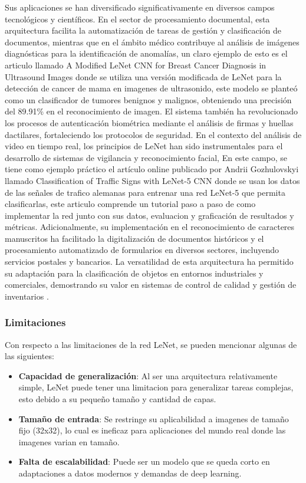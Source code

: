 Sus aplicaciones se han diversificado significativamente en diversos 
campos tecnológicos y científicos. En el sector de procesamiento documental, 
 esta arquitectura facilita la automatización de tareas de gestión y 
 clasificación de documentos, mientras que en el ámbito médico 
 contribuye al análisis de imágenes diagnósticas para la identificación 
 de anomalías, un claro ejemplo de esto es el articulo llamado 
 A Modified LeNet CNN for Breast Cancer Diagnosis in Ultrasound Images 
 \cite{lenet_medical} donde se utiliza una versión modificada de LeNet
    para la detección de cancer de mama en imagenes de ultrasonido, 
 este modelo se planteó como un clasificador de tumores benignos y
    malignos, obteniendo una precisión del 89.91\% en el reconocimiento
    de imagen. El sistema también ha revolucionado los procesos de 
 autenticación biométrica mediante el análisis de firmas y huellas 
 dactilares, fortaleciendo los protocolos de seguridad. 
 En el contexto del análisis de video en tiempo real, los principios 
 de LeNet han sido instrumentales para el desarrollo de sistemas de 
 vigilancia y reconocimiento facial, En este campo, se tiene como 
 ejemplo práctico el artículo online publicado por Andrii Gozhulovskyi
 llamado Classification of Traffic Signs with LeNet-5 CNN
 \cite{lenet_traffic_sings} donde se usan los datos de las señales de 
 trafico alemanas para entrenar una red LeNet-5 que permita 
 clasificarlas, este articulo comprende un tutorial paso a paso de 
 como implementar la red junto con sus datos, evaluacion y graficación
 de resultados y métricas. Adicionalmente, su implementación 
 en el reconocimiento de caracteres manuscritos ha facilitado la
  digitalización de documentos históricos y el procesamiento 
  automatizado de formularios en diversos sectores, incluyendo servicios
   postales y bancarios. La versatilidad de esta arquitectura ha 
   permitido su adaptación para la clasificación de objetos en entornos 
   industriales y comerciales, demostrando su valor en sistemas de 
   control de calidad y gestión de inventarios 
   \cite{lenet_history_geeks}.

\subsubsection{Limitaciones}

Con respecto a las limitaciones de la red LeNet, se pueden mencionar
algunas de las siguientes:

\begin{itemize}
    \item \textbf{Capacidad de generalización}:
    Al ser una arquitectura relativamente simple, LeNet puede tener
    una limitacion para generalizar tareas complejas, esto debido a su
    pequeño tamaño y cantidad de capas.
    \item \textbf{Tamaño de entrada}:
    Se restringe su aplicabilidad a imagenes de tamaño fijo (32x32),
    lo cual es ineficaz para aplicaciones del mundo real donde 
    las imagenes varian en tamaño.
    \item \textbf{Falta de escalabilidad}:
    Puede ser un modelo que se queda corto en adaptaciones a 
    datos modernos y demandas de deep learning.\cite{lenet_neha}
\end{itemize}